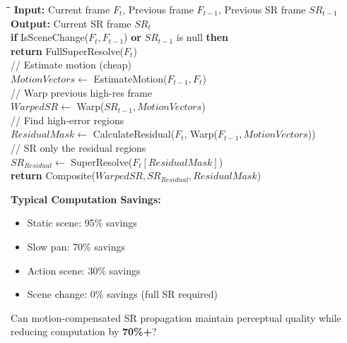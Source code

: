 \documentclass[11pt, a4paper]{article}
\begin{document}
\begin{algorithmbox}
\begin{tabbing}
\hspace{0.5cm}\=\hspace{0.5cm}\=\hspace{0.5cm}\=\kill
\textbf{Input:} Current frame $F_t$, Previous frame $F_{t-1}$, Previous SR frame $SR_{t-1}$ \\
\textbf{Output:} Current SR frame $SR_t$ \\[0.3em]
\> \textbf{if} IsSceneChange($F_t, F_{t-1}$) \textbf{or} $SR_{t-1}$ is null \textbf{then} \\
\>\> \textbf{return} FullSuperResolve($F_t$) \\
\textcolor{secondarygreen}{// Estimate motion (cheap)} \\
\> $MotionVectors \leftarrow$ EstimateMotion($F_{t-1}, F_t$) \\
\textcolor{secondarygreen}{// Warp previous high-res frame} \\
\> $WarpedSR \leftarrow$ Warp($SR_{t-1}, MotionVectors$) \\
\textcolor{secondarygreen}{// Find high-error regions} \\
\> $ResidualMask \leftarrow$ CalculateResidual($F_t$, Warp($F_{t-1}, MotionVectors$)) \\
\textcolor{secondarygreen}{// SR only the residual regions} \\
\> $SR_{Residual} \leftarrow$ SuperResolve($F_t[ResidualMask]$) \\
\> \textbf{return} Composite($WarpedSR, SR_{Residual}, ResidualMask$)
\end{tabbing}
\end{algorithmbox}

\begin{resultbox}
\textbf{Typical Computation Savings:}
\begin{itemize}[noitemsep]
    \item Static scene: 95\% savings
    \item Slow pan: 70\% savings
    \item Action scene: 30\% savings
    \item Scene change: 0\% savings (full SR required)
\end{itemize}
\end{resultbox}

\begin{researchq}
Can motion-compensated SR propagation maintain perceptual quality while reducing computation by \textbf{70\%+}?
\end{researchq}
\end{document}
